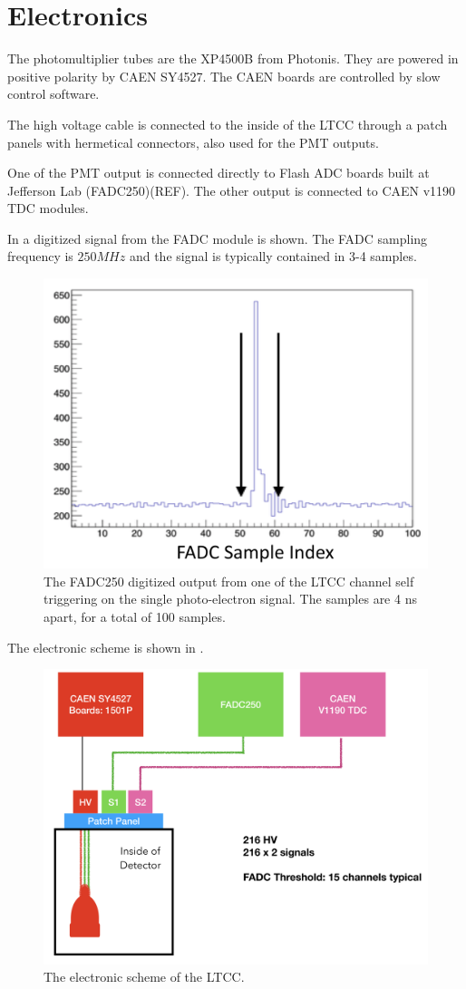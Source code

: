 \section{Electronics}



The photomultiplier tubes are the XP4500B from Photonis. They are powered in positive polarity by CAEN SY4527. The CAEN boards are controlled by slow control software.

The high voltage cable is connected to the inside of the LTCC through a patch panels with hermetical connectors, also used for the PMT outputs.

One of the PMT output is connected directly to Flash ADC boards built at Jefferson Lab (FADC250)(REF). The other output is connected to CAEN v1190 TDC modules.

In  a digitized signal from the FADC module is shown. The FADC sampling frequency is $250 MHz$ and the signal is typically contained in 3-4
samples.

\begin{figure}
	\centering
	\includegraphics[width=0.95\columnwidth,keepaspectratio]{img/fadc.png}
	\caption{The FADC250 digitized output from one of the LTCC channel self triggering on the single photo-electron signal. The samples are 4 ns apart, for a total of 100 samples. }
	\label{fig:fadc}
\end{figure}


The electronic scheme is shown in .

\begin{figure}
	\centering
	\includegraphics[width=0.95\columnwidth,keepaspectratio]{img/electronicScheme.png}
	\caption{The electronic scheme of the LTCC.}
	\label{fig:electronicScheme}
\end{figure}
